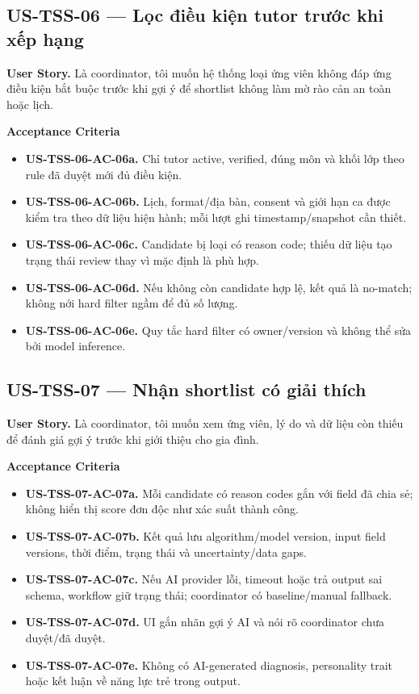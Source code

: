 \documentclass[11pt,a4paper]{article}
\newcommand{\ac}[1]{\textbf{\currentstory-AC-#1.}}
\newcommand{\storytitle}[2]{\subsection{#1 — #2}\def\currentstory{#1}}
\newcommand{\story}[1]{\textbf{User Story.} #1\par}
\newcommand{\acceptance}{\textbf{Acceptance Criteria}\par}
\begin{document}
\storytitle{US-TSS-06}{Lọc điều kiện tutor trước khi xếp hạng}
\story{Là coordinator, tôi muốn hệ thống loại ứng viên không đáp ứng điều kiện bắt buộc trước khi gợi ý để shortlist không làm mờ rào cản an toàn hoặc lịch.}
\acceptance
\begin{itemize}
  \item \ac{06a} Chỉ tutor active, verified, đúng môn và khối lớp theo rule đã duyệt mới đủ điều kiện.
  \item \ac{06b} Lịch, format/địa bàn, consent và giới hạn ca được kiểm tra theo dữ liệu hiện hành; mỗi lượt ghi timestamp/snapshot cần thiết.
  \item \ac{06c} Candidate bị loại có reason code; thiếu dữ liệu tạo trạng thái review thay vì mặc định là phù hợp.
  \item \ac{06d} Nếu không còn candidate hợp lệ, kết quả là no-match; không nới hard filter ngầm để đủ số lượng.
  \item \ac{06e} Quy tắc hard filter có owner/version và không thể sửa bởi model inference.
\end{itemize}

\storytitle{US-TSS-07}{Nhận shortlist có giải thích}
\story{Là coordinator, tôi muốn xem ứng viên, lý do và dữ liệu còn thiếu để đánh giá gợi ý trước khi giới thiệu cho gia đình.}
\acceptance
\begin{itemize}
  \item \ac{07a} Mỗi candidate có reason codes gắn với field đã chia sẻ; không hiển thị score đơn độc như xác suất thành công.
  \item \ac{07b} Kết quả lưu algorithm/model version, input field versions, thời điểm, trạng thái và uncertainty/data gaps.
  \item \ac{07c} Nếu AI provider lỗi, timeout hoặc trả output sai schema, workflow giữ trạng thái; coordinator có baseline/manual fallback.
  \item \ac{07d} UI gắn nhãn gợi ý AI và nói rõ coordinator chưa duyệt/đã duyệt.
  \item \ac{07e} Không có AI-generated diagnosis, personality trait hoặc kết luận về năng lực trẻ trong output.
\end{itemize}
\end{document}
